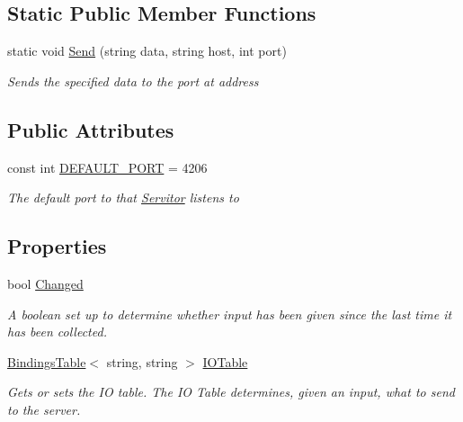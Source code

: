 \subsection*{Static Public Member Functions}
\begin{DoxyCompactItemize}
\item 
static void \hyperlink{classHumDrum_1_1Operations_1_1Servitor_a2e2fe524ce089bcd5f0f481ff3315c40}{Send} (string data, string host, int port)
\begin{DoxyCompactList}\small\item\em Sends the specified data to the port at address \end{DoxyCompactList}\end{DoxyCompactItemize}
\subsection*{Public Attributes}
\begin{DoxyCompactItemize}
\item 
const int \hyperlink{classHumDrum_1_1Operations_1_1Servitor_a97c78f85fb9cc1c96c61ea771cc97201}{D\+E\+F\+A\+U\+L\+T\+\_\+\+P\+O\+R\+T} = 4206
\begin{DoxyCompactList}\small\item\em The default port to that \hyperlink{classHumDrum_1_1Operations_1_1Servitor}{Servitor} listens to \end{DoxyCompactList}\end{DoxyCompactItemize}
\subsection*{Properties}
\begin{DoxyCompactItemize}
\item 
bool \hyperlink{classHumDrum_1_1Operations_1_1Servitor_aacd5394a7844c38e5d4bfd96b00deefe}{Changed}
\begin{DoxyCompactList}\small\item\em A boolean set up to determine whether input has been given since the last time it has been collected. \end{DoxyCompactList}\item 
\hyperlink{classHumDrum_1_1Structures_1_1BindingsTable}{Bindings\+Table}$<$ string, string $>$ \hyperlink{classHumDrum_1_1Operations_1_1Servitor_a01c71b67a5ca6154fd1938106b17ebf5}{I\+O\+Table}
\begin{DoxyCompactList}\small\item\em Gets or sets the I\+O table. The I\+O Table determines, given an input, what to send to the server. \end{DoxyCompactList}\end{DoxyCompactItemize}


